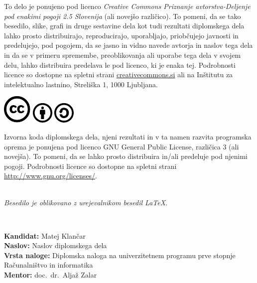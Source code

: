 \documentclass[a4paper,12pt,openright]{book}
\newcommand{\clearemptydoublepage}{\newpage{\pagestyle{empty}\cleardoublepage}}
\newcommand{\CcImageCc}[1]{%
	\includegraphics[scale=#1]{cc_cc_30.pdf}%
}
\newcommand{\CcImageBy}[1]{%
	\includegraphics[scale=#1]{cc_by_30.pdf}%
}
\newcommand{\CcImageSa}[1]{%
	\includegraphics[scale=#1]{cc_sa_30.pdf}%
}
\begin{document}
\newpage
\thispagestyle{empty}

\vspace*{5cm}
{\small \noindent
To delo je ponujeno pod licenco \textit{Creative Commons Priznanje avtorstva-Deljenje pod enakimi pogoji 2.5 Slovenija} (ali novej\v so razli\v cico).
To pomeni, da se tako besedilo, slike, grafi in druge sestavine dela kot tudi rezultati diplomskega dela lahko prosto distribuirajo,
reproducirajo, uporabljajo, priobčujejo javnosti in predelujejo, pod pogojem, da se jasno in vidno navede avtorja in naslov tega
dela in da se v primeru spremembe, preoblikovanja ali uporabe tega dela v svojem delu, lahko distribuira predelava le pod
licenco, ki je enaka tej.
Podrobnosti licence so dostopne na spletni strani \href{http://creativecommons.si}{creativecommons.si} ali na Inštitutu za
intelektualno lastnino, Streliška 1, 1000 Ljubljana.

\vspace*{1cm}
\begin{center}%
\CcImageCc{0.741573033707865}\hspace*{1ex}\CcImageBy{1}\hspace*{1ex}\CcImageSa{1}%
\end{center}
}

\vspace*{1cm}
{\small \noindent
Izvorna koda diplomskega dela, njeni rezultati in v ta namen razvita programska oprema je ponujena pod licenco GNU General Public License,
različica 3 (ali novejša). To pomeni, da se lahko prosto distribuira in/ali predeluje pod njenimi pogoji.
Podrobnosti licence so dostopne na spletni strani \url{http://www.gnu.org/licenses/}.
}

\vfill
\begin{center} 
\ \\ \vfill
{\em
Besedilo je oblikovano z urejevalnikom besedil \LaTeX.}
\end{center}

\clearemptydoublepage

\thispagestyle{empty}
\
\vfill

\bigskip
\noindent\textbf{Kandidat:} Matej Klančar\\
\noindent\textbf{Naslov:} Naslov diplomskega dela\\
\noindent\textbf{Vrsta naloge:} Diplomska naloga na univerzitetnem programu prve stopnje Računalništvo in informatika \\
\noindent\textbf{Mentor:} doc.\ dr.\ Aljaž Zalar\\
\end{document}
